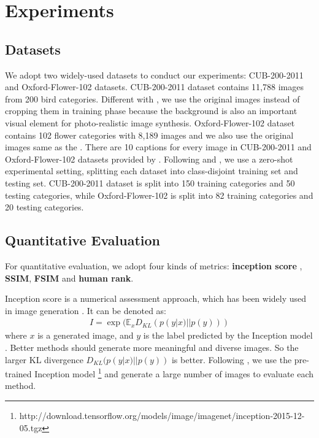 \documentclass[sigconf]{acmart}
\begin{document}
\section{Experiments}



\subsection{Datasets}
We adopt two widely-used datasets to conduct our experiments: CUB-200-2011 \cite{wah2011caltech} and Oxford-Flower-102 \cite{nilsback2008automated} datasets. CUB-200-2011 dataset contains 11,788 images from 200 bird categories. Different with \cite{zhang2016stackgan}, we use the original images instead of cropping them in training phase because the background is also an important visual element for photo-realistic image synthesis. Oxford-Flower-102 dataset contains 102 flower categories with 8,189 images and we also use the original images same as the \cite{zhang2016stackgan}. There are 10 captions for every image in CUB-200-2011 and Oxford-Flower-102 datasets provided by \cite{reed2016learning}. Following \cite{reed2016generative} and \cite{zhang2016stackgan}, we use a zero-shot experimental setting, splitting each dataset into class-disjoint training set and testing set. CUB-200-2011 dataset is split into 150 training categories and 50 testing categories, while Oxford-Flower-102 is split into 82 training categories and 20 testing categories. 


\subsection{Quantitative Evaluation}  

For quantitative evaluation, we adopt four kinds of metrics: \textbf{inception score} \cite{salimans2016improved}, \textbf{SSIM}\cite{wang2004image}, \textbf{FSIM}\cite{zhang2011fsim} and \textbf{human rank}.

Inception score is a numerical assessment approach, which has been widely used in image generation \cite{salimans2016improved, huang2017stacked, gulrajani2017improved, berthelot2017began, ma2017pose}. It can be denoted as:
\begin{align}
	I = \exp(\mathbb{E}_xD_{KL}(p(y|x)||p(y)))
\end{align}
where $x$ is a generated image, and $y$ is the label predicted by the Inception model \cite{szegedy2016rethinking}. Better methods should generate more meaningful and diverse images. So the larger KL divergence $D_{KL}(p(y|x)||p(y))$ is better. Following \cite{salimans2016improved, huang2017stacked}, we use the pre-trained Inception model \footnote{http://download.tensorflow.org/models/image/imagenet/inception-2015-12-05.tgz} and generate a large number of images to evaluate each method.
\end{document}
